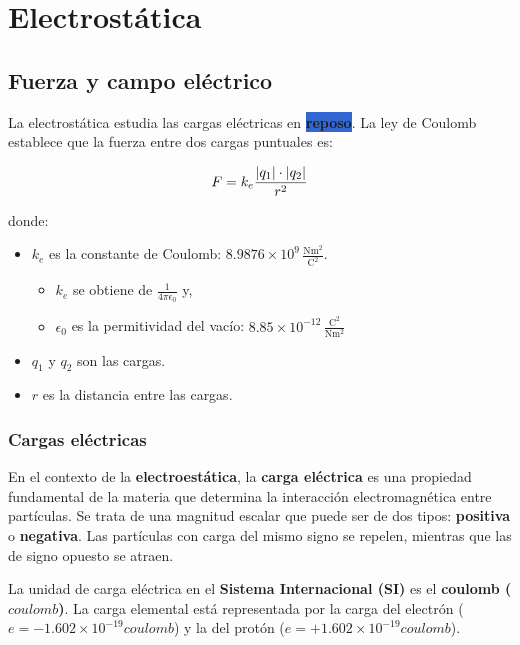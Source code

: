 \section{Electrostática}

\subsection{Fuerza y campo eléctrico}

La electrostática estudia las cargas eléctricas en \colorbox{highlight}{\textbf{reposo}}. La ley de Coulomb establece que la fuerza entre dos cargas puntuales es:

\begin{equation}
    F = k_e \frac{\abs{q_1} \cdot \abs{q_2}}{r^2}
\end{equation}

donde:

\begin{itemize}
    \item \( k_e \) es la constante de Coulomb: \( 8.9876 \times 10^9 \, \frac{\si{\newton\meter\squared}}{\si{\coulomb\squared}} \).
    \begin{itemize}
        \item \( k_e \) se obtiene de  \( \frac{1}{4\pi\epsilon_0} \) y,
        \item \( \epsilon_0 \) es la permitividad del vacío: \( 8.85 \times 10^{-12} \,\frac{\si{\coulomb\squared}}{\si{\newton\meter\squared}} \)
    \end{itemize}
    \item \( q_1 \) y \( q_2 \) son las cargas.
    \item \( r \) es la distancia entre las cargas.
\end{itemize}

\subsubsection{Cargas eléctricas}

En el contexto de la \textbf{electroestática}, la \textbf{carga eléctrica} es una propiedad fundamental de la materia que determina la interacción electromagnética entre partículas. Se trata de una magnitud escalar que puede ser de dos tipos: \textbf{positiva} o \textbf{negativa}. Las partículas con carga del mismo signo se repelen, mientras que las de signo opuesto se atraen.

La unidad de carga eléctrica en el \textbf{Sistema Internacional (SI)} es el \textbf{coulomb (\( \si{coulomb} \))}. La carga elemental está representada por la carga del electrón (\( e = -1.602 \times 10^{-19} \si{coulomb} \)) y la del protón (\( e = +1.602 \times 10^{-19} \si{coulomb} \)).


